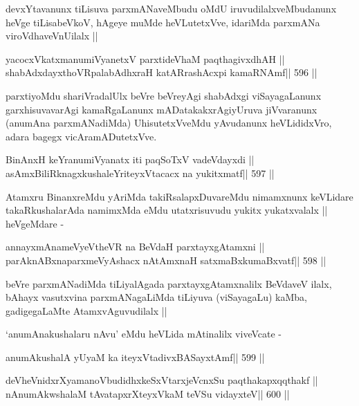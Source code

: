 \begin{artha}
devxYtavanunx tiLisuva parxmANaveMbudu oMdU iruvudilalxveMbudanunx
heVge tiLisabeVkoV, hAgeye muMde heVLutetxVve, idariMda parxmANa
viroVdhaveVnUilalx ||
\end{artha}

\begin{shl}
yacocxVkatxmanumiVyanetxV parxtideVhaM paqthagivxdhAH ||
shabAdxdayxthoVRpalabAdhxraH katARrashAcxpi kamaRNAmf\hfill || 596 ||
\end{shl}

\begin{artha}
parxtiyoMdu shariVradalUlx beVre beVreyAgi shabAdxgi viSayagaLanunx
garxhisuvavarAgi kamaRgaLanunx mADatakakxrAgiyUruva jiVvaranunx
(anumAna parxmANadiMda) UhisutetxVveMdu yAvudanunx heVLididxVro, adara
bagegx vicAramADutetxVve.
\end{artha}

\begin{shl}
BinAnxH keYranumiVyanatx iti paqSoTxV vadeVdayxdi ||
asAmxBiliRknagxkushaleYriteyxVtacacx na yukitxmatf\hfill || 597 ||
\end{shl}

\begin{artha}
Atamxru BinanxreMdu yAriMda takiRsalapxDuvareMdu nimamxnunx keVLidare
takaRkushalarAda namimxMda eMdu utatxrisuvudu yukitx yukatxvalalx ||
heVgeMdare -
\end{artha}

\begin{shl}
annayxmAnameVyeV\s theVR na BeVdaH parxtayxgAtamxni ||
parAknABxnaparxmeVyAshacx nA\s\s tAmxnaH satxmaBxkumaBxvatf\hfill || 598 ||
\end{shl}

\begin{artha}
beVre parxmANadiMda tiLiyalAgada parxtayxgAtamxnalilx BeVdaveV ilalx,
bAhayx vasutxvina parxmANagaLiMda tiLiyuva (viSayagaLu) kaMba,
gadigegaLaMte AtamxvAguvudilalx ||

`anumAnakushalaru nAvu' eMdu heVLida mAtinalilx viveVcate -
\end{artha}

\begin{shl}
anumAkushalA yUyaM ka iteyxVtadivxBASayxtAmf\hfill || 599 ||
\end{shl}

\begin{shl}
deVheVnidxrXyamanoVbudidhxkeSxVtarxjeVcnxSu paqthakapxqqthakf ||
nAnumAkwshalaM tAvatapxrXteyxVkaM teVSu vidayxteV\hfill || 600 ||
\end{shl}


